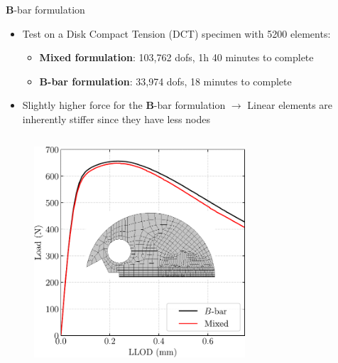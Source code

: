 \documentclass[9pt]{beamer}
\begin{document}

\begin{frame}{$\boldsymbol{B}$-bar formulation}

	\begin{itemize}
		\item Test on a Disk Compact Tension (DCT) specimen with 5200 elements:
		\vspace{0.25cm}
		
		\begin{itemize}
			\item \textbf{Mixed formulation}: 103,762 dofs, 1h 40 minutes to complete
			\vspace{0.25cm}
			\item $\boldsymbol{B}$\textbf{-bar formulation}: 33,974 dofs, 18 minutes to complete
		\end{itemize}
		\vspace{0.25cm}
		\item Slightly higher force for the $\boldsymbol{B}$-bar formulation $\rightarrow$ Linear elements are inherently stiffer since they have less nodes  
	\end{itemize}
	
\begin{columns}
	\begin{column}{0.5\textwidth}
		\begin{figure}
        \centering
        \includegraphics[width=0.7\textwidth]{Images/Load_LLOD_Bbar.pdf}
    \end{figure} 
	\end{column}
	

\end{columns}
\end{frame}
\end{document}
